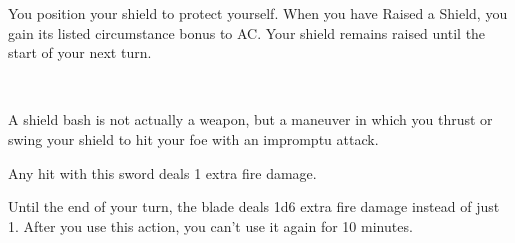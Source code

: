 \documentclass[paper=63mm:88mm, DIV=21, fontsize=7.5pt]{scrartcl}
\begin{document}

You position your shield to protect yourself. When you have Raised a Shield, you gain its listed circumstance bonus to AC. Your shield remains raised until the start of your next turn.


\\

A shield bash is not actually a weapon, but a maneuver in which you thrust or swing your shield to hit your foe with an impromptu attack.





Any hit with this sword deals 1 extra fire damage.



Until the end of your turn, the blade deals 1d6 extra fire damage instead of just 1. After you use this action, you can't use it again for 10 minutes.

\vfill

\\
\end{document}
